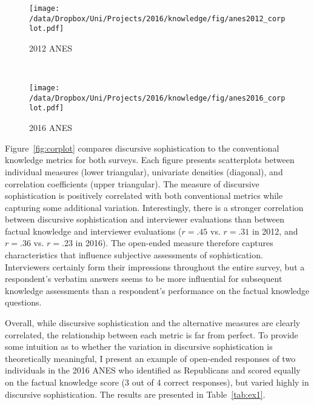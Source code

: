 \begin{figure*}[h]
    \centering
    \begin{subfigure}[t]{0.5\textwidth}
        \centering
        \texttt{[image: /data/Dropbox/Uni/Projects/2016/knowledge/fig/anes2012\_corplot.pdf]}
        \caption{2012 ANES}
    \end{subfigure}%
    ~ 
    \begin{subfigure}[t]{0.5\textwidth}
        \centering
        \texttt{[image: /data/Dropbox/Uni/Projects/2016/knowledge/fig/anes2016\_corplot.pdf]}
        \caption{2016 ANES}
    \end{subfigure}
    \caption[Correlation matrix of conventional political knowledge metrics and discursive sophistication]{Correlation matrix of conventional political knowledge metrics and discursive sophistication. The plots on the diagonal display univariate densities for each variable. The panels in the lower triangular display the scatter plot of two measures as well as a linear fit. The upper triangular displays the correlation coefficient. All correlations reported are statistically significant with $p<.05$.}\label{fig:corplot}
\end{figure*}

Figure~\ref{fig:corplot} compares discursive sophistication to the conventional knowledge metrics for both surveys. Each figure presents scatterplots between individual measures (lower triangular), univariate densities (diagonal), and correlation coefficients (upper triangular). The measure of discursive sophistication is positively correlated with both conventional metrics while capturing some additional variation. Interestingly, there is a stronger correlation between discursive sophistication and interviewer evaluations than between factual knowledge and interviewer evaluations ($r=.45$ vs. $r=.31$ in 2012, and $r=.36$ vs. $r=.23$ in 2016). The open-ended measure therefore captures characteristics that influence subjective assessments of sophistication. Interviewers certainly form their impressions throughout the entire survey, but a respondent's verbatim answers seems to be more influential for subsequent knowledge assessments than a respondent's performance on the factual knowledge questions.

Overall, while discursive sophistication and the alternative measures are clearly correlated, the relationship between each metric is far from perfect. To provide some intuition as to whether the variation in discursive sophistication is theoretically meaningful, I present an example of open-ended responses of two individuals in the 2016 ANES who identified as Republicans and scored equally on the factual knowledge score (3 out of 4 correct responses), but varied highly in discursive sophistication. The results are presented in Table~\ref{tab:ex1}.

